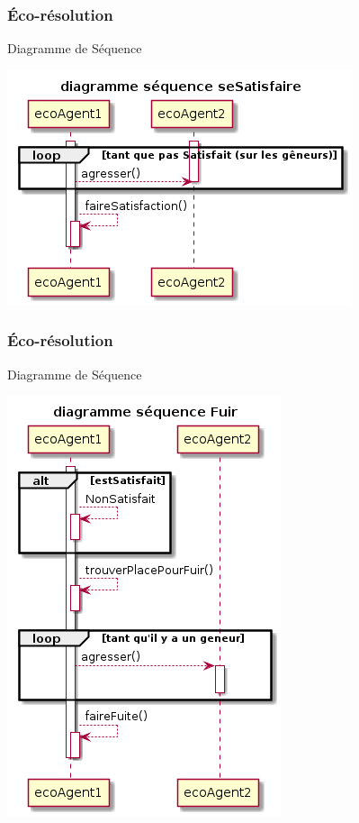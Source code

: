 \begin{frame}
    \frametitle{Éco-résolution}
    		\begin{block}{Diagramme de Séquence}
    		    		\begin{center}

    		     \includegraphics[scale=0.4]{diagrams/sequenceEcoResolution1.png}
    		\end{center}

    		\end{block}

\end{frame}

\begin{frame}
    \frametitle{Éco-résolution}
    		\begin{block}{Diagramme de Séquence}
    		    		\begin{center}

    		     \includegraphics[scale=0.4]{diagrams/sequenceEcoResolution2.png}
    		\end{center}

    		\end{block}

\end{frame}
